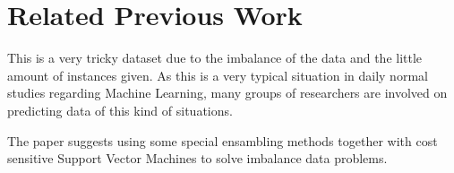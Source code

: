 \section{Related Previous Work}

This is a very tricky dataset due to the imbalance of the data and the little amount of instances given. As this is a very typical situation in daily normal studies regarding Machine Learning, many groups of researchers are involved on predicting data of this kind of situations.

The paper \cite{zieba2013boosted} suggests using some special ensambling methods together with cost sensitive Support Vector Machines to solve imbalance data problems.

%
%

